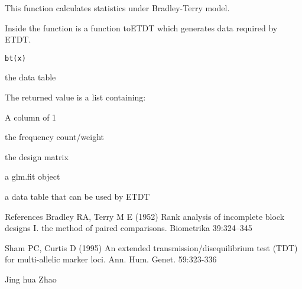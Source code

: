 \documentclass[a4paper]{book}
\begin{document}
\begin{Description}\relax
This function calculates statistics under Bradley-Terry model. 

Inside the function is a function toETDT which generates data required by ETDT.\end{Description}
\begin{Usage}
\begin{verbatim}bt(x)\end{verbatim}
\end{Usage}
\begin{Arguments}
\begin{ldescription}
\item[\code{x}] the data table
\end{ldescription}
\end{Arguments}
\begin{Value}
The returned value is a list containing:
\begin{ldescription}
\item[\code{y}] A column of 1
\item[\code{count}] the frequency count/weight
\item[\code{allele}] the design matrix
\item[\code{bt.glm}] a glm.fit object
\item[\code{etdt.dat}] a data table that can be used by ETDT
\end{ldescription}
\end{Value}
\begin{Section}{References}
Bradley RA, Terry M E (1952) Rank analysis of incomplete block designs I. 
the method of paired comparisons. Biometrika 39:324--345

Sham PC, Curtis D (1995) An extended transmission/disequilibrium 
test ({TDT}) for multi-allelic marker loci. Ann. Hum. Genet. 59:323-336\end{Section}
\begin{Author}\relax
Jing hua Zhao\end{Author}
\begin{SeeAlso}\relax
{}\end{SeeAlso}
\end{document}
